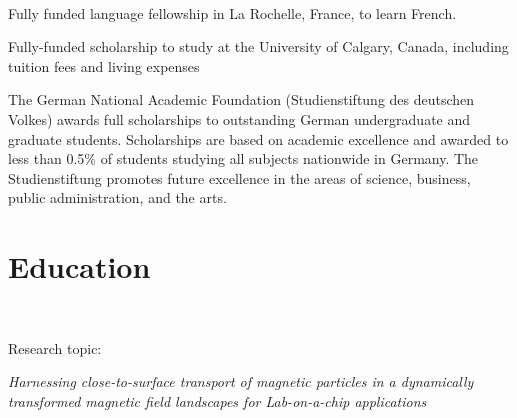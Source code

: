  \\
\begin{tightemize}
\item Fully funded language fellowship in La Rochelle, France, to learn French.
\end{tightemize}
\begin{tightemize}
\item Fully-funded scholarship to study at the University of Calgary, Canada, including tuition fees and living expenses %
\end{tightemize}
\begin{tightemize}
\item The German National Academic Foundation (Studienstiftung des deutschen Volkes) awards full scholarships to outstanding German undergraduate and graduate students. Scholarships are based on academic excellence and awarded to less than 
0.5\hspace{0.7pt}\%
of students studying all subjects nationwide in Germany. The Studienstiftung promotes future excellence in the areas of science, business, public administration, and the arts.
\end{tightemize}





\section{Education}
\\
\vspace{\topsep} %
\begin{tightemize}
\item Research topic: 

\textit{Harnessing close-to-surface transport of magnetic particles in a dynamically transformed magnetic field landscapes for Lab-on-a-chip applications}
\end{tightemize}


